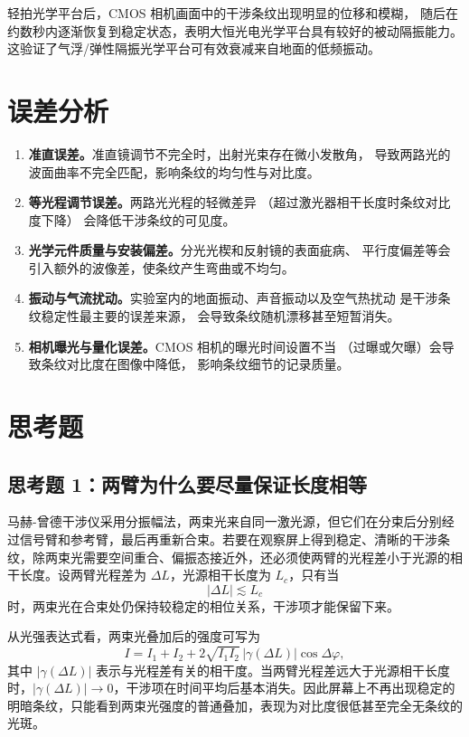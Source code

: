 \documentclass[12pt, a4paper]{article}
\begin{document}
轻拍光学平台后，CMOS 相机画面中的干涉条纹出现明显的位移和模糊，
随后在约数秒内逐渐恢复到稳定状态，表明大恒光电光学平台具有较好的被动隔振能力。
这验证了气浮/弹性隔振光学平台可有效衰减来自地面的低频振动。

\section{误差分析}

\begin{enumerate}
  \item \textbf{准直误差。}准直镜调节不完全时，出射光束存在微小发散角，
        导致两路光的波面曲率不完全匹配，影响条纹的均匀性与对比度。
  \item \textbf{等光程调节误差。}两路光光程的轻微差异
        （超过激光器相干长度时条纹对比度下降）
        会降低干涉条纹的可见度。
  \item \textbf{光学元件质量与安装偏差。}分光光楔和反射镜的表面疵病、
        平行度偏差等会引入额外的波像差，使条纹产生弯曲或不均匀。
  \item \textbf{振动与气流扰动。}实验室内的地面振动、声音振动以及空气热扰动
        是干涉条纹稳定性最主要的误差来源，
        会导致条纹随机漂移甚至短暂消失。
  \item \textbf{相机曝光与量化误差。}CMOS 相机的曝光时间设置不当
        （过曝或欠曝）会导致条纹对比度在图像中降低，
        影响条纹细节的记录质量。
\end{enumerate}

\section{思考题}

\subsection*{思考题 1：两臂为什么要尽量保证长度相等}

马赫-曾德干涉仪采用分振幅法，两束光来自同一激光源，但它们在分束后分别经过信号臂和参考臂，最后再重新合束。若要在观察屏上得到稳定、清晰的干涉条纹，除两束光需要空间重合、偏振态接近外，还必须使两臂的光程差小于光源的相干长度。设两臂光程差为 $\Delta L$，光源相干长度为 $L_c$，只有当
\begin{equation}
  |\Delta L| \lesssim L_c
\end{equation}
时，两束光在合束处仍保持较稳定的相位关系，干涉项才能保留下来。

从光强表达式看，两束光叠加后的强度可写为
\begin{equation}
  I = I_1 + I_2 + 2\sqrt{I_1 I_2}\,|\gamma(\Delta L)|\cos\Delta\varphi ,
\end{equation}
其中 $|\gamma(\Delta L)|$ 表示与光程差有关的相干度。当两臂光程差远大于光源相干长度时，$|\gamma(\Delta L)| \to 0$，干涉项在时间平均后基本消失。因此屏幕上不再出现稳定的明暗条纹，只能看到两束光强度的普通叠加，表现为对比度很低甚至完全无条纹的光斑。
\end{document}
